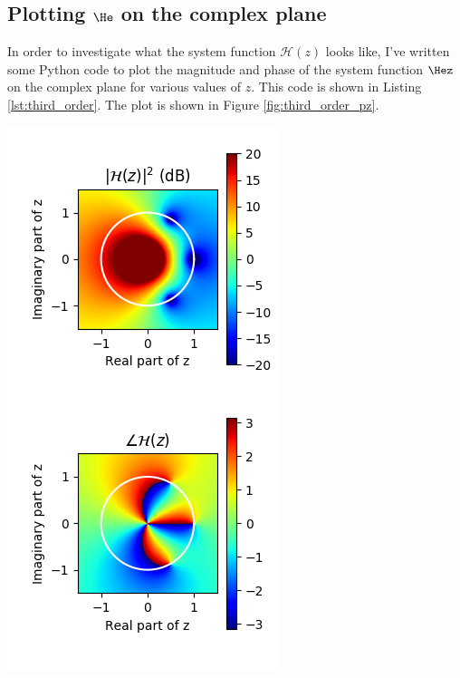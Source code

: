 \subsection{Plotting $\He$ on the complex plane}
In order to investigate what the system function $\mathcal{H}(z)$
looks like, I've written some Python code to plot the magnitude and
phase of the system function $\Hez$ on the complex plane for various
values of $z$. This code is shown in Listing
\ref{lst:third_order}. The plot is shown in Figure
\ref{fig:third_order_pz}.

\begin{marginfigure}
\begin{center}
\includegraphics[width=\textwidth]{code/025_system_function/z_mag_angle.png}

\end{center}
\end{marginfigure}
